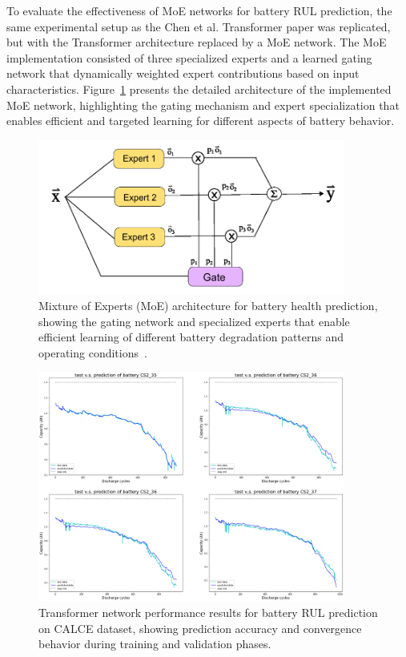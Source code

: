 To evaluate the effectiveness of MoE networks for battery RUL prediction, the same experimental setup as the Chen et al. Transformer paper was replicated, but with the Transformer architecture replaced by a MoE network. The MoE implementation consisted of three specialized experts and a learned gating network that dynamically weighted expert contributions based on input characteristics. Figure~\ref{fig:moe_architecture} presents the detailed architecture of the implemented MoE network, highlighting the gating mechanism and expert specialization that enables efficient and targeted learning for different aspects of battery behavior.

\begin{figure}[htbp]
\centering
\includegraphics[width=0.9\textwidth]{imgs/Moe_arq.png}
\caption{Mixture of Experts (MoE) architecture for battery health prediction, showing the gating network and specialized experts that enable efficient learning of different battery degradation patterns and operating conditions~\cite{moe_arq}.}
\label{fig:moe_architecture}
\end{figure}

\begin{figure}[htbp]
    \centering
    \includegraphics[width=0.9\textwidth]{imgs/transf_graph_results.png}
    \caption{Transformer network performance results for battery RUL prediction on CALCE dataset, showing prediction accuracy and convergence behavior during training and validation phases.}
    \label{fig:transformer_results}
\end{figure}

